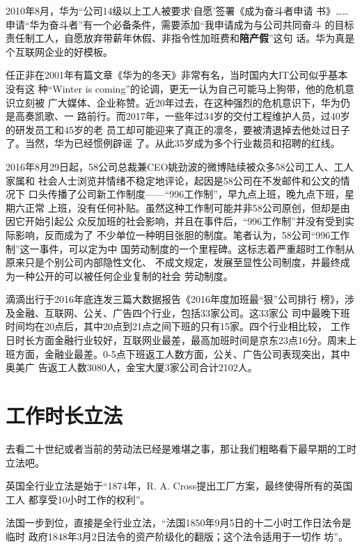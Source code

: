 2010年8月，华为“公司14级以上工人被要求`自愿'签署《成为奋斗者申请
书》……申请“华为奋斗者”有一个必备条件，需要添加“我申请成为与公司共同奋斗
的目标责任制工人，自愿放弃带薪年休假、非指令性加班费和\textbf{陪产假}”这句
话。\cite{huaweifendou}华为真是个互联网企业的好模板。

任正非在2001年有篇文章《华为的冬天》非常有名，当时国内大IT公司似乎基本没有这
种“Winter is coming”的论调，更无一认为自己可能马上狗带，他的危机意识立刻被
广大媒体、企业称赞。近20年过去，在这种强烈的危机意识下，华为仍是高奏凯歌、一
路前行。而2017年，一些年过34岁的交付工程维护人员，过40岁的研发员工和45岁的老
员工却可能迎来了真正的凛冬，要被清退掉去他处过日子了。当然，华为已经惯例辟谣
了。从此35岁成为多个行业裁员和招聘的红线。

2016年8月29日起，58公司总裁兼CEO姚劲波的微博陆续被众多58公司工人、工人家属和
社会人士浏览并情绪不稳定地评论\cite{tai58}，起因是58公司在不发邮件和公文的情况下
口头传播了公司新工作制度——“996工作制”，早九点上班，晚九点下班，星期六正常
上班，没有任何补贴。虽然这种工作制可能并非58公司原创，但却是由因它开始引起公
众反加班的社会影响，并且在事件后，“996工作制”并没有受到实际影响，反而成为了
不少单位一种明目张胆的制度。笔者认为，58公司“996工作制”这一事件，可以定为中
国劳动制度的一个里程碑。这标志着严重超时工作制从原来只是个别公司内部隐性文化、
不成文规定，发展至显性公司制度，并最终成为一种公开的可以被任何企业复制的社会
劳动制度。

滴滴出行于2016年底连发三篇大数据报告《2016年度加班最“狠”公司排行
榜》\cite{zuihen}，涉及金融、互联网、公关、广告四个行业，包括33家公司。这33家公
司中最晚下班时间均在20点后，其中20点到21点之间下班的只有15家。四个行业相比较，
工作日时长方面金融行业较好，互联网业最差，最高加班时间是京东23点16分。周末上
班方面，金融业最差。0-5点下班返工人数方面，公关、广告公司表现突出，其中奥美广
告返工人数3080人，金宝大厦3家公司合计2102人。

\section{工作时长立法}

去看二十世纪或者当前的劳动法已经是难堪之事，那让我们粗略看下最早期的工时立法吧。

英国全行业立法是始于“1874年，R. A. Cross提出工厂方案，最终使得所有的英国工人
都享受10小时工作的权利”。

法国一步到位，直接是全行业立法，“法国1850年9月5日的十二小时工作日法令是临时
政府1848年3月2日法令的资产阶级化的翻版；这个法令适用于一切作
坊”。

